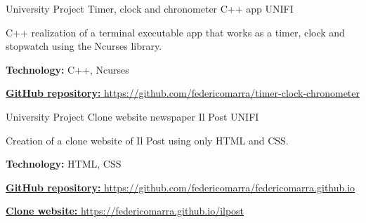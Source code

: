 \begin{cventries}
  \cventry
    {University Project} %
    {Timer, clock and chronometer C++ app} %
    {UNIFI} %
    {} %
    {
      \begin{cvitems} %
        \item {C++ realization of a terminal executable app that works as a timer, clock and stopwatch using the Ncurses library.}
        \item {\textbf{Technology:} C++, Ncurses}
        \item {\href{https://github.com/federicomarra/timer-clock-chronometer}{\textbf{GitHub repository:} https://github.com/federicomarra/timer-clock-chronometer}}
      \end{cvitems}
    }

  \cventry
    {University Project} %
    {Clone website newspaper Il Post} %
    {UNIFI} %
    {} %
    {
      \begin{cvitems} %
        \item {Creation of a clone website of Il Post using only HTML and CSS.}
        \item {\textbf{Technology:} HTML, CSS}
        \item {\href{https://github.com/federicomarra/federicomarra.github.io}{\textbf{GitHub repository:} https://github.com/federicomarra/federicomarra.github.io}}
        \item {\href{https://federicomarra.github.io/ilpost/}{\textbf{Clone website:} https://federicomarra.github.io/ilpost}}
      \end{cvitems}
    }


\end{cventries}
